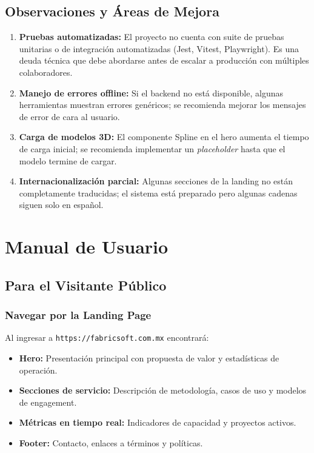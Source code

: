 \documentclass[12pt, a4paper, twoside]{report}
\begin{document}
\section{Observaciones y Áreas de Mejora}

\begin{enumerate}
  \item \textbf{Pruebas automatizadas:} El proyecto no cuenta con suite de pruebas unitarias
        o de integración automatizadas (Jest, Vitest, Playwright). Es una deuda técnica que
        debe abordarse antes de escalar a producción con múltiples colaboradores.

  \item \textbf{Manejo de errores offline:} Si el backend no está disponible, algunas
        herramientas muestran errores genéricos; se recomienda mejorar los mensajes de error
        de cara al usuario.

  \item \textbf{Carga de modelos 3D:} El componente Spline en el hero aumenta el tiempo de
        carga inicial; se recomienda implementar un \textit{placeholder} hasta que el modelo
        termine de cargar.

  \item \textbf{Internacionalización parcial:} Algunas secciones de la landing no están
        completamente traducidas; el sistema está preparado pero algunas cadenas siguen solo
        en español.
\end{enumerate}

\appendix
\clearpage
\chapter{Manual de Usuario}

\section{Para el Visitante Público}

\subsection{Navegar por la Landing Page}

Al ingresar a \texttt{https://fabricsoft.com.mx} encontrará:

\begin{itemize}
  \item \textbf{Hero:} Presentación principal con propuesta de valor y estadísticas de
        operación.
  \item \textbf{Secciones de servicio:} Descripción de metodología, casos de uso y modelos
        de engagement.
  \item \textbf{Métricas en tiempo real:} Indicadores de capacidad y proyectos activos.
  \item \textbf{Footer:} Contacto, enlaces a términos y políticas.
\end{itemize}
\end{document}
